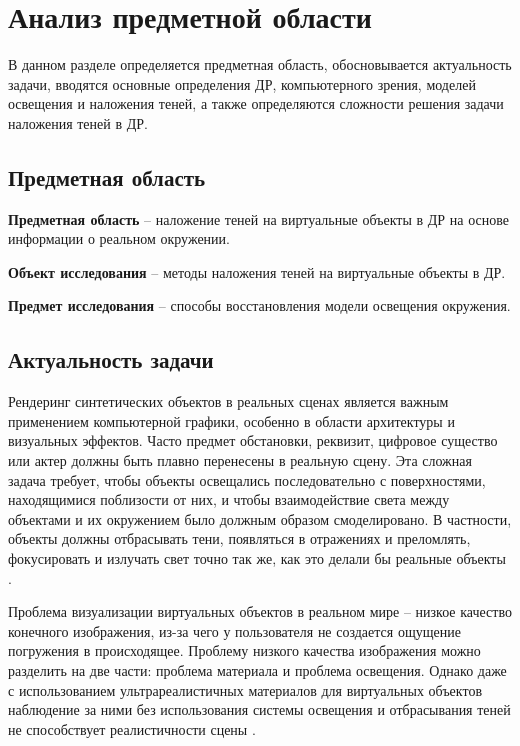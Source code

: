 \chapter{Анализ предметной области}

В данном разделе определяется предметная область, обосновывается актуальность задачи, вводятся основные определения ДР, компьютерного зрения, моделей освещения и наложения теней, а также определяются сложности решения задачи наложения теней в ДР.

\section{Предметная область}

\textbf{Предметная область} -- наложение теней  на виртуальные объекты в ДР на основе информации о реальном окружении.

\textbf{Объект исследования} -- методы наложения теней  на виртуальные объекты в ДР.

\textbf{Предмет исследования} -- способы восстановления модели освещения окружения.

\section{Актуальность задачи}

Рендеринг синтетических объектов в реальных сценах является важным применением компьютерной графики, особенно в области архитектуры и визуальных эффектов. Часто предмет обстановки, реквизит, цифровое существо или актер должны быть плавно перенесены в реальную сцену. Эта сложная задача требует, чтобы объекты освещались последовательно с поверхностями, находящимися поблизости от них, и чтобы взаимодействие света между объектами и их окружением было должным образом смоделировано. В частности, объекты должны отбрасывать тени, появляться в отражениях и преломлять, фокусировать и излучать свет точно так же, как это делали бы реальные объекты \cite{debevec2008rendering}.

Проблема визуализации виртуальных объектов в реальном мире -- низкое качество конечного изображения, из-за чего у пользователя не создается ощущение погружения в происходящее. Проблему низкого качества изображения можно разделить на две части: проблема материала и проблема освещения. Однако даже с использованием ультрареалистичных материалов для виртуальных объектов наблюдение за ними без использования системы освещения и отбрасывания теней не способствует реалистичности сцены \cite{osti2019real}.

